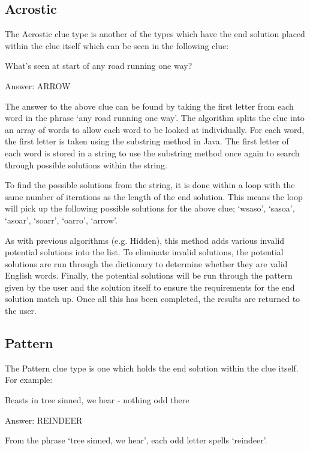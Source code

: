 \subsection{Acrostic}

The Acrostic clue type is another of the types which have the end solution
placed within  the clue itself which can be seen in the following clue:

What's seen at start of any road running one way?

Answer: ARROW

The answer to the above clue can be found by taking the first letter from each
word in  the phrase `any road running one way'. The algorithm splits the clue
into an array of words  to allow each word to be looked at individually. For
each word, the first letter is taken using the substring method in Java. The 
first letter of each word is stored in a string to use the substring method 
once again to search through possible solutions within the string.

To find the possible solutions from the string, it is done within a loop with the same number 
of iterations as the length of the end solution. This means the loop will pick up the 
following possible solutions for the above clue; `wsaso', `sasoa', `asoar', 
`soarr', `oarro', `arrow'.

As with previous algorithms (e.g. Hidden), this method adds various 
invalid potential solutions into the list. To eliminate invalid solutions, the 
potential solutions are run through the dictionary to determine whether 
they are valid English words. Finally, the potential solutions will be run through 
the pattern given by the user and the solution itself to ensure the 
requirements for the end solution match up. Once all this has been completed, 
the results are returned to the user. 

\subsection{Pattern}

The Pattern clue type is one which holds the end solution within the clue 
itself. For example: 

Beasts in tree sinned, we hear - nothing odd there

Answer: REINDEER

From the phrase `tree sinned, we hear', each odd letter spells `reindeer'. 

